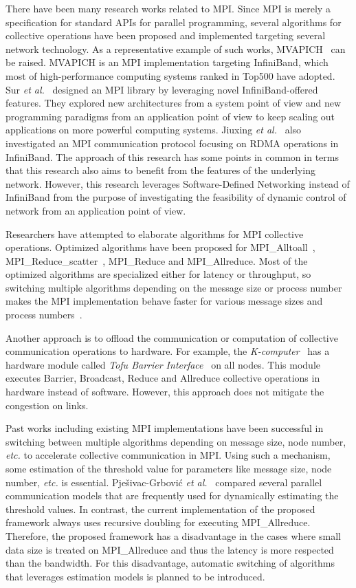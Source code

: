 There have been many research works related to MPI\@. Since MPI is merely a
specification for standard APIs for parallel programming, several algorithms
for collective operations have been proposed and implemented targeting several
network technology. As a representative example of such works,
MVAPICH~\autocite{mvapich} can be raised. MVAPICH is an MPI implementation
targeting InfiniBand, which most of high-performance computing systems ranked
in Top500 have adopted. Sur \emph{et al.}~\autocite{Sur2011} designed an MPI
library by leveraging novel InfiniBand-offered features. They explored new
architectures from a system point of view and new programming paradigms from
an application point of view to keep scaling out applications on more powerful
computing systems. Jiuxing \emph{et al.}~\autocite{Jiuxing2004} also
investigated an MPI communication protocol focusing on RDMA operations in
InfiniBand. The approach of this research has some points in common in terms
that this research also aims to benefit from the features of the underlying
network. However, this research leverages Software-Defined Networking instead
of InfiniBand from the purpose of investigating the feasibility of dynamic
control of network from an application point of view.

Researchers have attempted to elaborate algorithms for MPI collective
operations. Optimized algorithms have been proposed for
MPI\_Alltoall~\autocite{Bruck1997},
MPI\_Reduce\_scatter~\autocite{Iannello1997}, MPI\_Reduce and MPI\_Allreduce.
Most of the optimized algorithms are specialized either for latency or
throughput, so switching multiple algorithms depending on the message size or
process number makes the MPI implementation behave faster for various message
sizes and process numbers~\autocite{Thakur2005}.

Another approach is to offload the communication or computation of collective
communication operations to hardware. For example, the
\emph{K-computer}~\autocite{Yokokawa2011} has a hardware module called
\emph{Tofu Barrier Interface}~\autocite{Ajima2012} on all nodes. This module
executes Barrier, Broadcast, Reduce and Allreduce collective operations in
hardware instead of software. However, this approach does not mitigate
the congestion on links.

Past works including existing MPI implementations have been successful in
switching between multiple algorithms depending on message size, node number,
\emph{etc.} to accelerate collective communication in MPI\@. Using such a
mechanism, some estimation of the threshold value for parameters like message
size, node number, \emph{etc.} is essential. Pje\v{s}ivac-Grbovi\'{c} \emph{et
al.}~\autocite{PjesivacGrbovic2007} compared several parallel communication
models that are frequently used for dynamically estimating the threshold
values. In contrast, the current implementation of the proposed framework
always uses recursive doubling for executing MPI\_Allreduce. Therefore, the
proposed framework has a disadvantage in the cases where small data size is
treated on MPI\_Allreduce and thus the latency is more respected than the
bandwidth. For this disadvantage, automatic switching of algorithms that
leverages estimation models is planned to be introduced.

